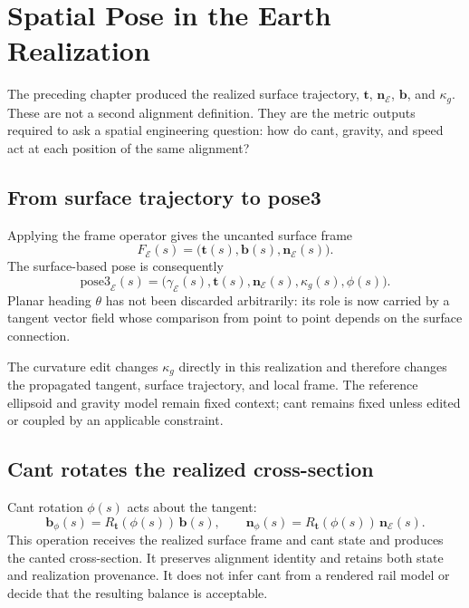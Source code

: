 
\chapter{Spatial Pose in the Earth Realization}

The preceding chapter produced the realized surface trajectory,
\(\mathbf t\), \(\mathbf n_{\mathcal E}\), \(\mathbf b\), and
\(\kappa_g\). These are not a second alignment definition. They are the
metric outputs required to ask a spatial engineering question: how do
cant, gravity, and speed act at each position of the same alignment?

\section{From surface trajectory to pose3}

Applying the frame operator gives the uncanted surface frame
\[
F_{\mathcal E}(s)=
\bigl(\mathbf t(s),\mathbf b(s),\mathbf n_{\mathcal E}(s)\bigr).
\]
The surface-based pose is consequently
\[
\mathrm{pose3}_{\mathcal E}(s)=
\bigl(
\gamma_{\mathcal E}(s),
\mathbf t(s),
\mathbf n_{\mathcal E}(s),
\kappa_g(s),
\phi(s)
\bigr).
\]
Planar heading \(\theta\) has not been discarded arbitrarily: its role
is now carried by a tangent vector field whose comparison from point to
point depends on the surface connection.

The curvature edit changes \(\kappa_g\) directly in this realization and
therefore changes the propagated tangent, surface trajectory, and local
frame. The reference ellipsoid and gravity model remain fixed context;
cant remains fixed unless edited or coupled by an applicable constraint.

\section{Cant rotates the realized cross-section}

Cant rotation \(\phi(s)\) acts about the tangent:
\[
\mathbf b_{\phi}(s)
=R_{\mathbf t}(\phi(s))\,\mathbf b(s),
\qquad
\mathbf n_{\phi}(s)
=R_{\mathbf t}(\phi(s))\,\mathbf n_{\mathcal E}(s).
\]
This operation receives the realized surface frame and cant state and
produces the canted cross-section. It preserves alignment identity and
retains both state and realization provenance. It does not infer cant
from a rendered rail model or decide that the resulting balance is
acceptable.


